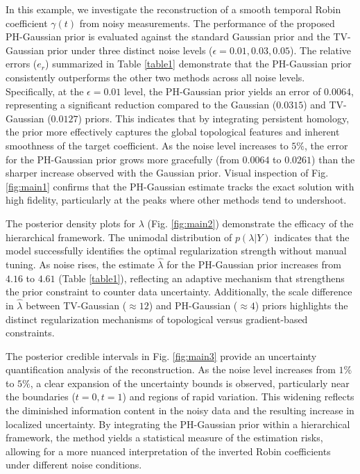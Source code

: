 \documentclass{ws-mplb}
\begin{document}
In this example, we investigate the reconstruction of a smooth temporal Robin coefficient $\gamma(t)$ from noisy measurements. 
The performance of the proposed PH-Gaussian prior is evaluated against the standard Gaussian prior and the TV-Gaussian prior under three distinct noise levels ($\epsilon = 0.01, 0.03, 0.05$). 
The relative errors ($e_r$) summarized in Table \ref{table1} demonstrate that the PH-Gaussian prior consistently outperforms the other two methods across all noise levels. 
Specifically, at the $\epsilon = 0.01$ level, the PH-Gaussian prior yields an error of $0.0064$, representing a significant reduction compared to the Gaussian ($0.0315$) and TV-Gaussian ($0.0127$) priors. 
This indicates that by integrating persistent homology, the prior more effectively captures the global topological features and inherent smoothness of the target coefficient. 
As the noise level increases to $5\%$, the error for the PH-Gaussian prior grows more gracefully (from $0.0064$ to $0.0261$) than the sharper increase observed with the Gaussian prior. 
Visual inspection of Fig. \ref{fig:main1} confirms that the PH-Gaussian estimate tracks the exact solution with high fidelity, particularly at the peaks where other methods tend to undershoot.



The posterior density plots for $\lambda$ (Fig. \ref{fig:main2}) demonstrate the efficacy of the hierarchical framework. The unimodal distribution of $p(\lambda | Y)$ indicates that the model successfully identifies the optimal regularization strength without manual tuning. As noise rises, the estimate $\hat{\lambda}$ for the PH-Gaussian prior increases from $4.16$ to $4.61$ (Table \ref{table1}), reflecting an adaptive mechanism that strengthens the prior constraint to counter data uncertainty. Additionally, the scale difference in $\hat{\lambda}$ between TV-Gaussian ($\approx 12$) and PH-Gaussian ($\approx 4$) priors highlights the distinct regularization mechanisms of topological versus gradient-based constraints.

The posterior credible intervals in Fig. \ref{fig:main3} provide an uncertainty quantification analysis of the reconstruction. As the noise level increases from $1\%$ to $5\%$, a clear expansion of the uncertainty bounds is observed, particularly near the boundaries ($t=0, t=1$) and regions of rapid variation. This widening reflects the diminished information content in the noisy data and the resulting increase in localized uncertainty. By integrating the PH-Gaussian prior within a hierarchical framework, the method yields a statistical measure of the estimation risks, allowing for a more nuanced interpretation of the inverted Robin coefficients under different noise conditions.
\end{document}
